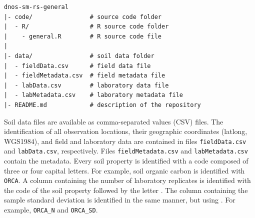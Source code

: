 \begin{verbatim}
dnos-sm-rs-general
|- code/                # source code folder
|  - R/                 # R source code folder
|    - general.R        # R source code file
|
|- data/                # soil data folder
|  - fieldData.csv      # field data file
|  - fieldMetadata.csv  # field metadata file
|  - labData.csv        # laboratory data file
|  - labMetadata.csv    # laboratory metadata file
|- README.md            # description of the repository
\end{verbatim}

Soil data files are available as comma-separated values (CSV) files. The identification of all observation 
locations, their geographic coordinates (latlong, WGS1984), and field and laboratory data are contained in 
files \texttt{fieldData.csv} and \texttt{labData.csv}, respectively. Files \texttt{fieldMetadata.csv} and 
\texttt{labMetadata.csv} contain the metadata. Every soil property is identified with a code composed of three 
or four capital letters. For example, soil organic carbon is identified with \texttt{ORCA}. A column 
containing the number of laboratory replicates is identified with the code of the soil property followed by 
the letter . The column containing the sample standard deviation is identified in the same manner, but 
using . For example, \texttt{ORCA\_N} and \texttt{ORCA\_SD}.

% 
% 
% 
% 
